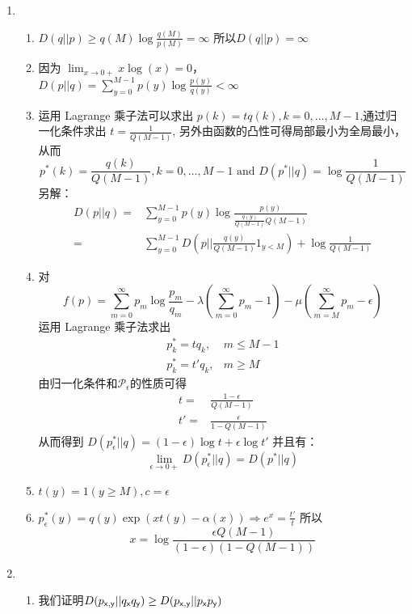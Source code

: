 \documentclass[a4paper]{article}
\begin{document}
\begin{enumerate}[label=\thehwcnt.\arabic*.]
  \setlength{\itemsep}{3\parskip}

  \item 
    \begin{enumerate}[label=(\alph*)]
  \item 
    $D(q||p) \geq q(M)\log\frac{q(M)}{p(M)}=\infty$
    所以$D(q||p)=\infty$
  \item 因为 $\displaystyle\lim_{x\to 0+} x\log(x)=0$，
   $D(p||q) =\displaystyle\sum_{y=0}^{M-1} p(y)\log\frac{p(y)}{q(y)}<\infty$
  \item 运用 Lagrange 乘子法可以求出 $p(k)=t q(k),k=0,\dots,M-1$,通过归一化条件求出
  $t=\frac{1}{Q(M-1)}$, 另外由函数的凸性可得局部最小为全局最小，从而
  \[
   p^*(k)=\frac{q(k)}{Q(M-1)},k=0,\dots,M-1 \textrm{ and } D(p^* || q )=\log\frac{1}{Q(M-1)}
  \]
   另解：
   \begin{align*}
   D(p||q) = & \sum_{y=0}^{M-1} p(y) \log \frac{p(y)}{\frac{q(y)}{Q(M-1)}Q(M-1)}\\
           = & \sum_{y=0}^{M-1} D\left(p|| \frac{q(y)}{Q(M-1)} 1_{y<M}\right)+\log \frac{1}{Q(M-1)}
   \end{align*}
  \item 对
  \[
   f(p)=\sum_{m=0}^{\infty} p_m \log \frac{p_m}{q_m} -\lambda (
   \sum_{m=0}^{\infty} p_m -1) -\mu (\sum_{m=M}^{\infty} p_m -\epsilon)
  \]
  运用 Lagrange 乘子法求出
  \begin{align*}
    p^*_k =  t q_k,& m \leq M-1 \\
    p^*_k =  t' q_k,& m \geq M
   \end{align*}
   由归一化条件和$\mathcal{P}_{\epsilon}$的性质可得
  \begin{align*}
    t = &  \frac{1-\epsilon}{Q(M-1)} \\
    t'= &  \frac{\epsilon}{1-Q(M-1)}
   \end{align*}
   从而得到 $D(p^*_{\epsilon}||q)=(1-\epsilon)\log t+\epsilon\log t'$
   并且有：
   \[
    \lim_{\epsilon\to 0+}D(p^*_{\epsilon}||q)=D(p^*||q)
   \]
   \item $t(y)=1(y\geq M),c=\epsilon$
   \item $p_{\epsilon}^*(y) = q(y)\exp(xt(y)-\alpha(x))\Rightarrow e^x = \frac{t'}{t}$
   所以 $$ x=\log\frac{\epsilon Q(M-1)}{(1-\epsilon)(1-Q(M-1))}$$
   \end{enumerate}
   \item
   \begin{enumerate}[label=(\alph*)]
   \item 我们证明$D(p_{\mathsf{x},\mathsf{y}}||q_{\mathsf{x}}q_{\mathsf{y}})\geq D(p_{\mathsf{x},\mathsf{y}}||p_{\mathsf{x}}p_{\mathsf{y}})$

\end{enumerate}
\end{enumerate}
\end{document}
